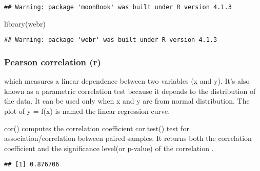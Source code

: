 \documentclass[
]{article}
\newenvironment{Shaded}{\begin{snugshade}}{\end{snugshade}}
\newcommand{\AttributeTok}[1]{\textcolor[rgb]{0.77,0.63,0.00}{#1}}
\newcommand{\FunctionTok}[1]{\textcolor[rgb]{0.00,0.00,0.00}{#1}}
\newcommand{\NormalTok}[1]{#1}
\newcommand{\SpecialCharTok}[1]{\textcolor[rgb]{0.00,0.00,0.00}{#1}}
\newcommand{\StringTok}[1]{\textcolor[rgb]{0.31,0.60,0.02}{#1}}
\begin{document}
\begin{verbatim}
## Warning: package 'moonBook' was built under R version 4.1.3
\end{verbatim}

\begin{Shaded}
\begin{Highlighting}[]
\FunctionTok{library}\NormalTok{(webr)}
\end{Highlighting}
\end{Shaded}

\begin{verbatim}
## Warning: package 'webr' was built under R version 4.1.3
\end{verbatim}

\hypertarget{pearson-correlation-r}{%
\subsubsection{Pearson correlation (r)}\label{pearson-correlation-r}}

which measures a linear dependence between two variables (x and y). It's
also known as a parametric correlation test because it depends to the
distribution of the data. It can be used only when x and y are from
normal distribution. The plot of y = f(x) is named the linear regression
curve.

cor() computes the correlation coefficient cor.test() test for
association/correlation between paired samples. It returns both the
correlation coefficient and the significance level(or p-value) of the
correlation .

\begin{Shaded}
\end{Shaded}

\begin{verbatim}
## [1] 0.876706
\end{verbatim}

\begin{Shaded}
\end{Shaded}
\end{document}
